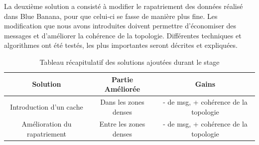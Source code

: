 \par La deuxième solution a consisté à modifier le rapatriement des données réalisé dans Blue Banana, pour que celui-ci se fasse de manière plus fine. Les modification que nous avons introduites doivent permettre d'économiser des messages et d'améliorer la cohérence de la topologie. Différentes techniques et algorithmes ont été testés, les plus importantes seront décrites et expliquées.
 
\begin{table}[!h]
  \begin{center}
    \begin{tabular}{|c|c|c|}
      \hline
      Solution & Partie Améliorée & Gains\\
      \hline
      Introduction d'un cache  & Dans les zones denses & - de msg, + cohérence de la topologie \\
      Amélioration du rapatriement & Entre les zones denses & - de msg, + cohérence de la topologie\\
      \hline
    \end{tabular}
  \end{center}
  \label{tab:config2}
  \caption{Tableau récapitulatif des solutions ajoutées durant le stage}
\end{table}




